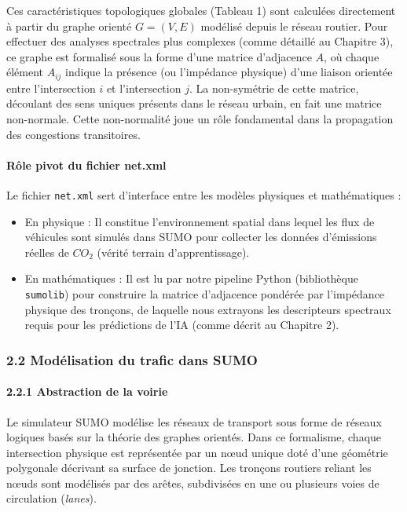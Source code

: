 \documentclass[10pt, a4paper]{article}
\providecommand{\tightlist}{}
\begin{document}
Ces caractéristiques topologiques globales (Tableau 1) sont calculées
directement à partir du graphe orienté \(G=(V, E)\) modélisé depuis le
réseau routier. Pour effectuer des analyses spectrales plus complexes
(comme détaillé au Chapitre 3), ce graphe est formalisé sous la forme
d'une matrice d'adjacence \(A\), où chaque élément \(A_{ij}\) indique la
présence (ou l'impédance physique) d'une liaison orientée entre
l'intersection \(i\) et l'intersection \(j\). La non-symétrie de cette
matrice, découlant des sens uniques présents dans le réseau urbain, en
fait une matrice non-normale. Cette non-normalité joue un rôle
fondamental dans la propagation des congestions transitoires.

\paragraph{Rôle pivot du fichier
net.xml}\label{ruxf4le-pivot-du-fichier-net.xml}

Le fichier \texttt{net.xml} sert d'interface entre les modèles physiques
et mathématiques :

\begin{itemize}
\tightlist
\item
  En physique : Il constitue l'environnement spatial dans lequel les
  flux de véhicules sont simulés dans SUMO pour collecter les données
  d'émissions réelles de \(CO_2\) (vérité terrain d'apprentissage).
\item
  En mathématiques : Il est lu par notre pipeline Python (bibliothèque
  \texttt{sumolib}) pour construire la matrice d'adjacence pondérée par
  l'impédance physique des tronçons, de laquelle nous extrayons les
  descripteurs spectraux requis pour les prédictions de l'IA (comme
  décrit au Chapitre 2).
\end{itemize}

\subsubsection{2.2 Modélisation du trafic dans
SUMO}\label{moduxe9lisation-du-trafic-dans-sumo}

\paragraph{2.2.1 Abstraction de la
voirie}\label{abstraction-de-la-voirie}

Le simulateur SUMO modélise les réseaux de transport sous forme de
réseaux logiques basés sur la théorie des graphes orientés. Dans ce
formalisme, chaque intersection physique est représentée par un nœud
unique doté d'une géométrie polygonale décrivant sa surface de jonction.
Les tronçons routiers reliant les nœuds sont modélisés par des arêtes,
subdivisées en une ou plusieurs voies de circulation (\emph{lanes}).
\end{document}
